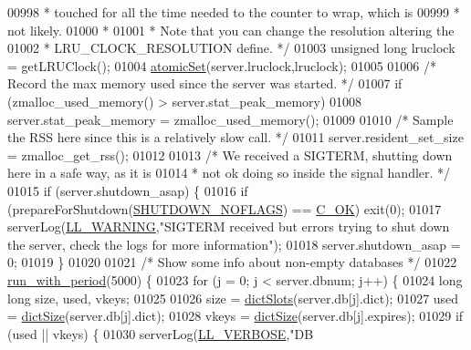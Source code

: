 \begin{DoxyCode}
{{{{{00998 \textcolor{comment}{     * touched for all the time needed to the counter to wrap, which is}
00999 \textcolor{comment}{     * not likely.}
01000 \textcolor{comment}{     *}
01001 \textcolor{comment}{     * Note that you can change the resolution altering the}
01002 \textcolor{comment}{     * LRU\_CLOCK\_RESOLUTION define. */}
01003     \textcolor{keywordtype}{unsigned} \textcolor{keywordtype}{long} lruclock = getLRUClock();
01004     \hyperlink{atomicvar_8h_a0f02b5846dcf4ed3669ecf771c512d12}{atomicSet}(server.lruclock,lruclock);
01005 
01006     \textcolor{comment}{/* Record the max memory used since the server was started. */}
01007     \textcolor{keywordflow}{if} (zmalloc\_used\_memory() > server.stat\_peak\_memory)
01008         server.stat\_peak\_memory = zmalloc\_used\_memory();
01009 
01010     \textcolor{comment}{/* Sample the RSS here since this is a relatively slow call. */}
01011     server.resident\_set\_size = zmalloc\_get\_rss();
01012 
01013     \textcolor{comment}{/* We received a SIGTERM, shutting down here in a safe way, as it is}
01014 \textcolor{comment}{     * not ok doing so inside the signal handler. */}
01015     \textcolor{keywordflow}{if} (server.shutdown\_asap) \{
01016         \textcolor{keywordflow}{if} (prepareForShutdown(\hyperlink{server_8h_a077401d3a9f810d535c00725ef6c6532}{SHUTDOWN\_NOFLAGS}) == \hyperlink{server_8h_a303769ef1065076e68731584e758d3e1}{C\_OK}) exit(0);
01017         serverLog(\hyperlink{server_8h_a31229b9334bba7d6be2a72970967a14b}{LL\_WARNING},\textcolor{stringliteral}{"SIGTERM received but errors trying to shut down the server,
       check the logs for more information"});
01018         server.shutdown\_asap = 0;
01019     \}
01020 
01021     \textcolor{comment}{/* Show some info about non-empty databases */}
01022     \hyperlink{server_8h_aeb204872adbaabc0bd56c64f562b7928}{run\_with\_period}(5000) \{
01023         \textcolor{keywordflow}{for} (j = 0; j < server.dbnum; j++) \{
01024             \textcolor{keywordtype}{long} \textcolor{keywordtype}{long} size, used, vkeys;
01025 
01026             size = \hyperlink{dict_8h_aca9596be4bcc2caa07c17dd8cebcceec}{dictSlots}(server.db[j].dict);
01027             used = \hyperlink{dict_8h_af193430dd3d5579a52b194512f72c1f0}{dictSize}(server.db[j].dict);
01028             vkeys = \hyperlink{dict_8h_af193430dd3d5579a52b194512f72c1f0}{dictSize}(server.db[j].expires);
01029             \textcolor{keywordflow}{if} (used || vkeys) \{
01030                 serverLog(\hyperlink{server_8h_a479b60032f8da6d8ad72e1a9d0809950}{LL\_VERBOSE},\textcolor{stringliteral}{"DB %
}}}}}}
\end{DoxyCode}
